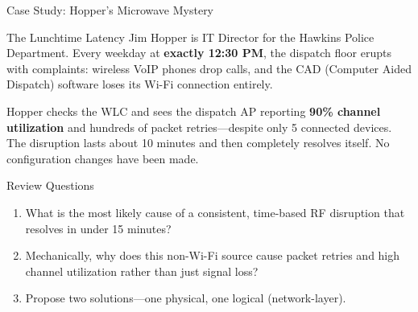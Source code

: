 \documentclass[aspectratio=169]{beamer}
\begin{document}
\begin{frame}{Case Study: Hopper's Microwave Mystery}
    \begin{casestudy}{The Lunchtime Latency}
        \footnotesize
        Jim Hopper is IT Director for the Hawkins Police Department. Every weekday at \textbf{exactly 12:30 PM}, the dispatch floor erupts with complaints: wireless VoIP phones drop calls, and the CAD (Computer Aided Dispatch) software loses its Wi-Fi connection entirely.

        \vspace{0.3em}
        Hopper checks the WLC and sees the dispatch AP reporting \textbf{90\% channel utilization} and hundreds of packet retries---despite only 5 connected devices. The disruption lasts about 10 minutes and then completely resolves itself. No configuration changes have been made.
    \end{casestudy}

    \begin{block}{Review Questions}
        \footnotesize
        \begin{enumerate}
            \item What is the most likely cause of a consistent, time-based RF disruption that resolves in under 15 minutes?
            \item Mechanically, why does this non-Wi-Fi source cause packet retries and high channel utilization rather than just signal loss?
            \item Propose two solutions---one physical, one logical (network-layer).
        \end{enumerate}
    \end{block}
\end{frame}
\end{document}
